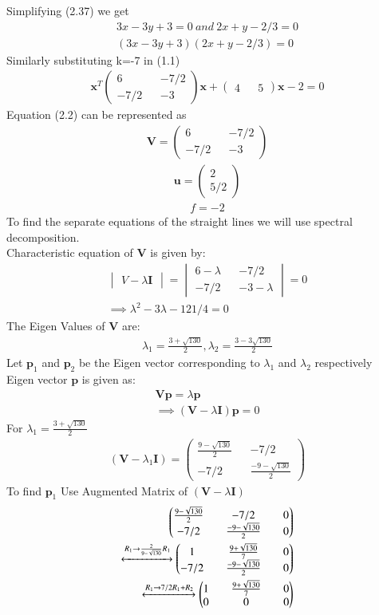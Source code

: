 \documentclass[journal,13pt,twocolumn]{IEEEtran}
\newcommand{\myvec}[1]{\ensuremath{\begin{pmatrix}#1\end{pmatrix}}}
\newcommand{\mydet}[1]{\ensuremath{\begin{vmatrix}#1\end{vmatrix}}}
\renewcommand{\vec}[1]{\mathbf{#1}}
\begin{document}
Simplifying (2.37) we get 
\begin{align}
3x - 3y + 3 = 0 ~and~ 2x + y - 2/3 = 0\\
\boxed{(3x - 3y + 3)(2x + y - 2/3) = 0}
\end{align}
Similarly substituting k=-7 in (1.1)
\begin{align}
\vec{x}^T \myvec{6 && -7/2 \\ -7/2 && -3} \vec{x} + \myvec{4 && 5}\vec{x} -2 = 0
\end{align}
Equation (2.2) can be represented as 
\begin{align}
\vec{V}=\myvec{6 && -7/2\\ -7/2 && -3}
\end{align}
\begin{align}
\vec{u}=\myvec{2\\5/2}
\end{align}
\begin{align}
f= -2
\end{align}
To find the separate equations of the straight lines we will use spectral decomposition.\\
Characteristic equation of $\vec{V}$ is given by:
\begin{align}
\mydet{V-\lambda \vec{I}}=\mydet{6-\lambda && -7/2\\ -7/2 && -3-\lambda} = 0\\
\implies \lambda^2 - 3\lambda - 121/4 = 0
\end{align}
The Eigen Values of $\vec{V}$ are:
\begin{align}
\lambda_1 = \frac{3+\sqrt{130}}{2}, \lambda_2 = \frac{3-3\sqrt{130}}{2}
\end{align}
Let $\vec{p}_1$ and $\vec{p}_2$ be the Eigen vector corresponding to $\lambda_1$ and $\lambda_2$ respectively\\
Eigen vector $\vec{p}$ is given as:
\begin{align}
\vec{V}\vec{p} = \lambda\vec{p}\\
\implies (\vec{V} - \lambda \vec{I})\vec{p} = 0
\end{align}
For $\lambda_1 = \frac{3+\sqrt{130}}{2}$
\begin{align}
(\vec{V} - \lambda_1 \vec{I}) = \myvec{\frac{9-\sqrt{130}}{2} && -7/2\\ -7/2 && \frac{-9-\sqrt{130}}{2}}
\end{align}
To find $ \vec{p}_1 $ Use Augmented Matrix of $(\vec{V} - \lambda \vec{I})$
\begin{align}
 \myvec{\frac{9-\sqrt{130}}{2} && -7/2 && 0\\ -7/2 && \frac{-9-\sqrt{130}}{2} && 0}\\
\xleftrightarrow[]{R_1\rightarrow \frac{2}{9-\sqrt{130}}R_1} 
\myvec{1 && \frac{9+\sqrt{130}}{7} && 0\\ -7/2 && \frac{-9-\sqrt{130}}{2} && 0}\\
\xleftrightarrow[]{R_1\rightarrow 7/2R_1+R_2} 
\myvec{1 && \frac{9+\sqrt{130}}{7} && 0\\ 0 && 0 && 0} 
\end{align}
\end{document}

